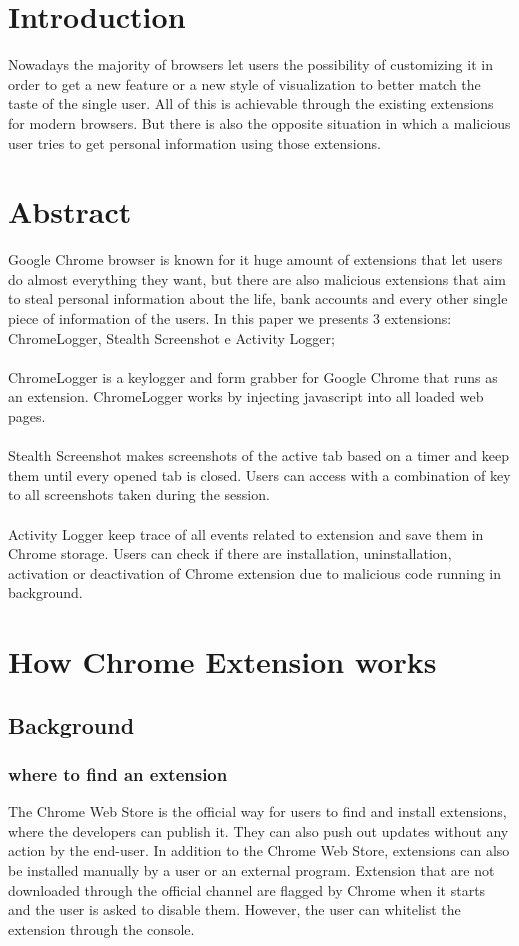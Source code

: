 \documentclass[12pt]{article}
\begin{document}
\begin{multicols}{2}
	\section*{Introduction}
	Nowadays the majority of browsers let users the possibility of customizing it in order to get a new feature or a new style of visualization to better match the taste of the single user.
	All of this is achievable through the existing extensions for modern browsers. But there is also the opposite situation in which a malicious user tries to get personal information using those extensions.
	
	\section*{Abstract}
	Google Chrome browser is known for it huge amount of extensions that let users do almost everything they want, but there are also malicious extensions that aim to steal personal information about the life, bank accounts and every other single piece of information of the users. In this paper we presents 3 extensions: ChromeLogger\cite{ChromeLogger}, Stealth Screenshot e Activity Logger;\\ \\
	ChromeLogger is a keylogger and form grabber for Google Chrome that runs as an extension.	
	ChromeLogger works by injecting javascript into all loaded web pages.\\ \\
	Stealth Screenshot makes screenshots of the active tab based on a timer and keep them until every opened tab is closed. Users can access with a combination of key to all screenshots taken during the session.\\ \\
	Activity Logger keep trace of all events related to extension and save them in Chrome storage. Users can check if there are installation, uninstallation, activation or deactivation of Chrome extension due to malicious code running in background.
\section*{How Chrome Extension works}
\subsection*{Background}
\subsubsection*{where to find an extension}
The Chrome Web Store is the official way for users
to find and install extensions, where the developers can publish it. They can also push out updates without any action
by the end-user.
In addition to the Chrome Web Store, extensions can
also be installed manually by a user or an external program.
Extension that are not downloaded through the official channel are flagged by Chrome when it starts	and the user is asked to disable them.
However, the user can whitelist the extension through the console.

\end{multicols}
\end{document}
